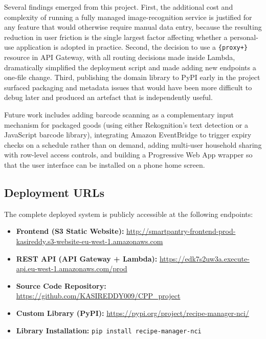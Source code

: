 \documentclass[conference]{IEEEtran}
\begin{document}
Several findings emerged from this project. First, the additional cost and complexity of running a fully managed image-recognition service is justified for any feature that would otherwise require manual data entry, because the resulting reduction in user friction is the single largest factor affecting whether a personal-use application is adopted in practice. Second, the decision to use a \texttt{\{proxy+\}} resource in API Gateway, with all routing decisions made inside Lambda, dramatically simplified the deployment script and made adding new endpoints a one-file change. Third, publishing the domain library to PyPI early in the project surfaced packaging and metadata issues that would have been more difficult to debug later and produced an artefact that is independently useful.

Future work includes adding barcode scanning as a complementary input mechanism for packaged goods (using either Rekognition's text detection or a JavaScript barcode library), integrating Amazon EventBridge to trigger expiry checks on a schedule rather than on demand, adding multi-user household sharing with row-level access controls, and building a Progressive Web App wrapper so that the user interface can be installed on a phone home screen.

\subsection*{Deployment URLs}
The complete deployed system is publicly accessible at the following endpoints:

\begin{itemize}
    \item \textbf{Frontend (S3 Static Website):} \url{http://smartpantry-frontend-prod-kasireddy.s3-website-eu-west-1.amazonaws.com}
    \item \textbf{REST API (API Gateway + Lambda):} \url{https://edk7s2uw3a.execute-api.eu-west-1.amazonaws.com/prod}
    \item \textbf{Source Code Repository:} \url{https://github.com/KASIREDDY009/CPP_project}
    \item \textbf{Custom Library (PyPI):} \url{https://pypi.org/project/recipe-manager-nci/}
    \item \textbf{Library Installation:} \texttt{pip install recipe-manager-nci}
\end{itemize}
\end{document}
